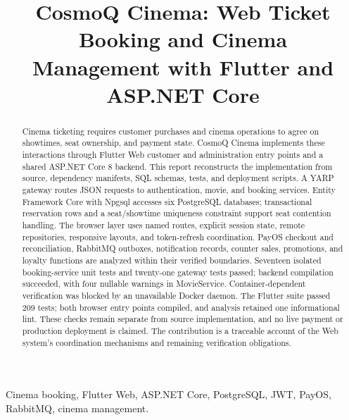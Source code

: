 \documentclass[conference]{IEEEtran}
\begin{document}
\title{CosmoQ Cinema: Web Ticket Booking and Cinema\\Management with Flutter and ASP.NET Core}
\author{
}
\maketitle
\begin{abstract}
Cinema ticketing requires customer purchases and cinema operations to agree on
showtimes, seat ownership, and payment state. CosmoQ Cinema implements these
interactions through Flutter Web customer and administration entry points and
a shared ASP.NET Core 8 backend. This report reconstructs the implementation
from source, dependency manifests, SQL schemas, tests, and deployment scripts.
A YARP gateway routes JSON requests to authentication, movie, and booking
services. Entity Framework Core with Npgsql accesses six PostgreSQL databases;
transactional reservation rows and a seat/showtime uniqueness constraint support
seat contention handling. The browser layer uses named routes, explicit session
state, remote repositories, responsive layouts, and token-refresh coordination.
PayOS checkout and reconciliation, RabbitMQ outboxes, notification records,
counter sales, promotions, and loyalty functions are analyzed within their
verified boundaries. Seventeen isolated booking-service unit tests and
twenty-one gateway tests passed; backend compilation succeeded, with four
nullable warnings in MovieService. Container-dependent verification was blocked
by an unavailable Docker daemon. The Flutter suite passed 209 tests; both browser entry points compiled,
and analysis retained one informational lint. These checks remain separate
from source implementation, and no live payment or production
deployment is claimed. The contribution is a traceable account of the Web
system's coordination mechanisms and remaining verification obligations.
\end{abstract}
\begin{IEEEkeywords}
Cinema booking, Flutter Web, ASP.NET Core, PostgreSQL, JWT, PayOS, RabbitMQ, cinema management.
\end{IEEEkeywords}
\end{document}
